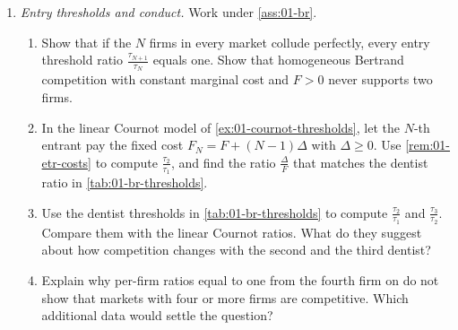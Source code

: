 \begin{enumerate}[label=\arabic*., leftmargin=*, itemsep=6pt]
\item \textit{Entry thresholds and conduct.} Work under \cref{ass:01-br}.
\begin{enumerate}[label=(\alph*)]
  \item Show that if the $N$ firms in every market collude perfectly, every entry threshold ratio
  $\frac{\tau_{N+1}}{\tau_N}$ equals one. Show that homogeneous Bertrand competition with constant marginal cost
  and $F > 0$ never supports two firms.
  \item In the linear Cournot model of \cref{ex:01-cournot-thresholds}, let the $N$-th entrant pay the fixed cost
  $F_N = F + (N - 1)\Delta$ with $\Delta \ge 0$. Use \cref{rem:01-etr-costs} to compute $\frac{\tau_2}{\tau_1}$,
  and find the ratio $\frac{\Delta}{F}$ that matches the dentist ratio in \cref{tab:01-br-thresholds}.
  \item Use the dentist thresholds in \cref{tab:01-br-thresholds} to compute $\frac{\tau_2}{\tau_1}$ and
  $\frac{\tau_3}{\tau_2}$. Compare them with the linear Cournot ratios. What do they suggest about how competition
  changes with the second and the third dentist?
  \item Explain why per-firm ratios equal to one from the fourth firm on do not show that markets with four or
  more firms are competitive. Which additional data would settle the question?
\end{enumerate}

\end{enumerate}
